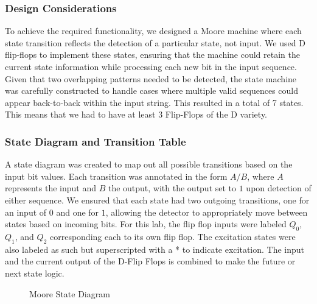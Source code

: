 \documentclass[12pt]{article}
\begin{document}
\subsubsection*{Design Considerations}
\quad To achieve the required functionality, we designed a Moore machine where each
state transition reflects the detection of a particular state, not input. We
used D flip-flops to implement these states, ensuring that the machine could
retain the current state information while processing each new bit in the input
sequence. Given that two overlapping patterns needed to be detected, the state
machine was carefully constructed to handle cases where multiple valid sequences
could appear back-to-back within the input string. This resulted in a total of 7
states. This means that we had to have at least 3 Flip-Flops of the D variety.

\subsubsection*{State Diagram and Transition Table}
\quad A state diagram was created to map out all possible transitions based on the input bit values. Each transition was annotated in the form \( A/B \), where \( A \) represents the input and \( B \) the output, with the output set to \( 1 \) upon detection of either sequence. We ensured that each state had two outgoing transitions, one for an input of \( 0 \) and one for \( 1 \), allowing the detector to appropriately move between states based on incoming bits.
For this lab, the flip flop inputs were labeled \(Q_0\), \(Q_1\), and \(Q_2\)
corresponding each to its own flip flop. The excitation states were also labeled
as such but superscripted with a * to indicate excitation. The input and the
current output of the D-Flip Flops is combined to make the future or next state
logic.
\begin{figure}[H]
	\caption{Moore State Diagram}
\end{figure}
\end{document}
